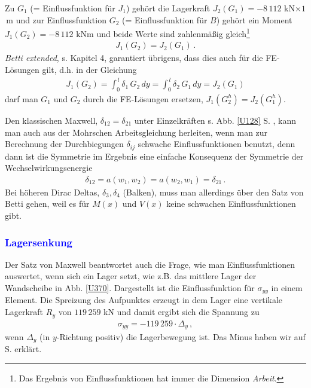 Zu $G_1$ (= Einflussfunktion f\"{u}r $J_1$) geh\"{o}rt die Lagerkraft $J_2(G_1) = -8\, 112$ kN$\times 1$\,m und zur Einflussfunktion $G_2$ (= Einflussfunktion f\"{u}r $B$) geh\"{o}rt ein Moment $J_1(G_2) = -8\,112$ kNm und beide Werte sind zahlenm\"{a}{\ss}ig gleich\footnote{Das Ergebnis von Einflussfunktionen hat immer die Dimension {\em Arbeit\/}.}
\begin{align}
J_1(G_2) = J_2(G_1)\,.
\end{align}
{\em Betti extended\/}, s. Kapitel 4, garantiert \"{u}brigens, dass dies auch f\"{u}r die FE-L\"{o}sungen gilt, d.h. in der Gleichung
\begin{align}
J_1(G_2) = \int_0^{\,l} \delta_1\, G_2\,dy = \int_0^{\,l} \delta_2\,G_1\,dy  = J_2(G_1)
\end{align}
darf man $G_1$ und $G_2$ durch die FE-L\"{o}sungen ersetzen, $J_1(G_2^h) = J_2(G_1^h)$.\\

\begin{remark}
Den klassischen Maxwell, $\delta_{12} = \delta_{21}$ unter Einzelkr\"{a}ften s. Abb. \ref{U128} S. \pageref{U128}, kann man auch aus der Mohrschen Arbeitsgleichung herleiten, wenn man zur Berechnung der Durchbiegungen $\delta_{ij}$ schwache Einflussfunktionen benutzt, denn dann ist die Symmetrie im Ergebnis eine einfache Konsequenz der Symmetrie der Wechselwirkungsenergie
\begin{align}
\delta_{12} = a(w_1,w_2) = a(w_2,w_1) = \delta_{21} \,.
\end{align}
Bei \glq h\"{o}heren\grq{} Dirac Deltas, $\delta_3, \delta_4$ (Balken), muss man allerdings \"{u}ber den Satz von Betti gehen, weil es f\"{u}r $M(x)$ und $V(x)$ keine schwachen Einflussfunktionen gibt.
\end{remark}

\vspace{-0.5cm}
{\textcolor{blue}{\subsubsection*{Lagersenkung}}}
Der Satz von Maxwell beantwortet auch die Frage, wie man Einflussfunktionen auswertet, wenn sich ein Lager setzt, wie z.B. das mittlere Lager der Wandscheibe in Abb. \ref{U370}. Dargestellt ist die Einflussfunktion f\"{u}r $\sigma_{yy}$ in einem Element. Die Spreizung des Aufpunktes erzeugt in dem Lager eine vertikale Lagerkraft $R_y$ von $119\,259$ kN und damit ergibt sich die Spannung zu
\begin{align}
\sigma_{yy} = -119\,259 \cdot \Delta_y\,,
\end{align}
wenn $\Delta_y$ (in $y$-Richtung positiv) die Lagerbewegung ist. Das Minus haben wir auf S. \pageref{LagerWeg} erkl\"{a}rt.

